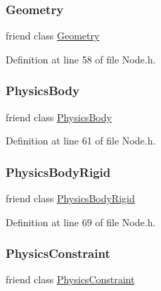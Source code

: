 \subsubsection{\texorpdfstring{Geometry}{Geometry}}
{\footnotesize\ttfamily friend class \mbox{\hyperlink{classnjli_1_1_geometry}{Geometry}}\hspace{0.3cm}{\ttfamily [friend]}}



Definition at line 58 of file Node.\+h.

\mbox{\label{classnjli_1_1_node_a5602338bf4d8e0e6baa58d3daa8dc90a}} 
\subsubsection{\texorpdfstring{Physics\+Body}{PhysicsBody}}
{\footnotesize\ttfamily friend class \mbox{\hyperlink{classnjli_1_1_physics_body}{Physics\+Body}}\hspace{0.3cm}{\ttfamily [friend]}}



Definition at line 61 of file Node.\+h.

\mbox{\label{classnjli_1_1_node_ada345e4f9c2a87f06868b74d30e94ad2}} 
\subsubsection{\texorpdfstring{Physics\+Body\+Rigid}{PhysicsBodyRigid}}
{\footnotesize\ttfamily friend class \mbox{\hyperlink{classnjli_1_1_physics_body_rigid}{Physics\+Body\+Rigid}}\hspace{0.3cm}{\ttfamily [friend]}}



Definition at line 69 of file Node.\+h.

\mbox{\label{classnjli_1_1_node_aa59c958a66870f0d251ec0dd477d2eff}} 
\subsubsection{\texorpdfstring{Physics\+Constraint}{PhysicsConstraint}}
{\footnotesize\ttfamily friend class \mbox{\hyperlink{classnjli_1_1_physics_constraint}{Physics\+Constraint}}\hspace{0.3cm}{\ttfamily [friend]}}



